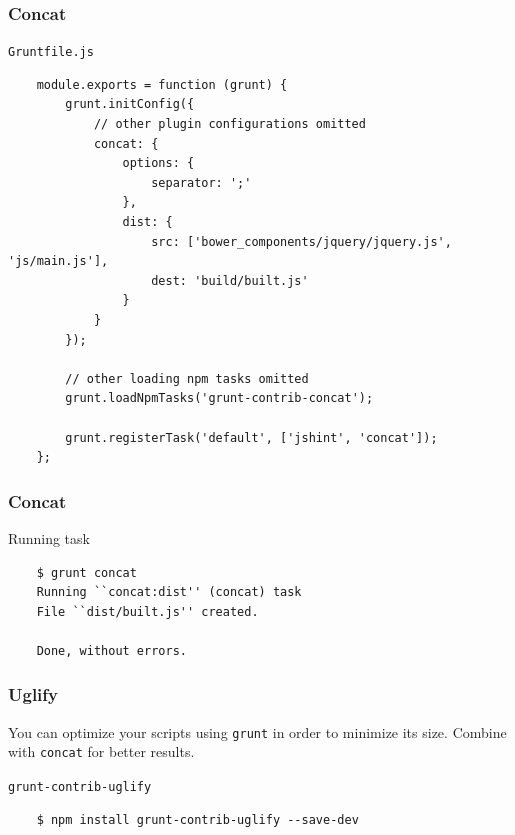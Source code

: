 \begin{frame}[fragile]
  \frametitle{Concat}

  \begin{block}{\texttt{Gruntfile.js}}
    {\tiny
    \begin{verbatim}
    module.exports = function (grunt) {
        grunt.initConfig({
            // other plugin configurations omitted
            concat: {
                options: {
                    separator: ';'
                },
                dist: {
                    src: ['bower_components/jquery/jquery.js', 'js/main.js'],
                    dest: 'build/built.js'
                }
            }
        });

        // other loading npm tasks omitted
        grunt.loadNpmTasks('grunt-contrib-concat');

        grunt.registerTask('default', ['jshint', 'concat']);
    };
    \end{verbatim}
    }
  \end{block}
\end{frame}

\begin{frame}[fragile]
  \frametitle{Concat}

  \begin{block}{Running task}
    {\tiny
    \begin{verbatim}
    $ grunt concat
    Running ``concat:dist'' (concat) task
    File ``dist/built.js'' created.

    Done, without errors.
    \end{verbatim}
    }
  \end{block}
\end{frame}

\begin{frame}[fragile]
  \frametitle{Uglify}

  You can optimize your scripts using \texttt{grunt} in order to minimize its size. Combine with \texttt{concat} for better results.

  \pause

  \begin{block}{\texttt{grunt-contrib-uglify}}
    {\tiny
    \begin{verbatim}
    $ npm install grunt-contrib-uglify --save-dev
    \end{verbatim}
    }
  \end{block}
\end{frame}

